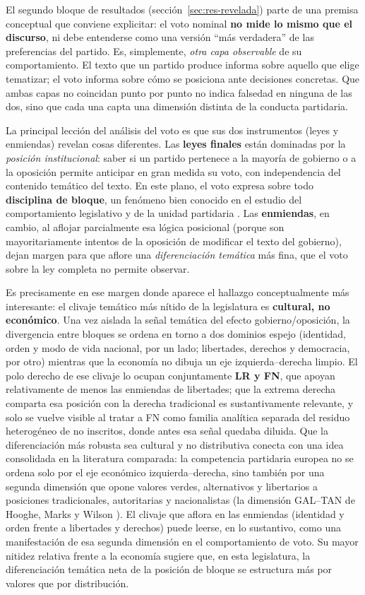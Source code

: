 El segundo bloque de resultados (sección~\ref{sec:res-revelada}) parte de una
premisa conceptual que conviene explicitar: el voto nominal \textbf{no mide lo
mismo que el discurso}, ni debe entenderse como una versión ``más verdadera'' de
las preferencias del partido. Es, simplemente, \emph{otra capa observable} de su
comportamiento. El texto que un partido produce informa sobre aquello que elige
tematizar; el voto informa sobre cómo se posiciona ante decisiones concretas. Que
ambas capas no coincidan punto por punto no indica falsedad en ninguna de las
dos, sino que cada una capta una dimensión distinta de la conducta partidaria.

La principal lección del análisis del voto es que sus dos instrumentos (leyes y
enmiendas) revelan cosas diferentes. Las \textbf{leyes finales} están dominadas
por la \emph{posición institucional}: saber si un partido pertenece a la mayoría
de gobierno o a la oposición permite anticipar en gran medida su voto, con
independencia del contenido temático del texto. En este plano, el voto expresa
sobre todo \textbf{disciplina de bloque}, un fenómeno bien conocido en el estudio
del comportamiento legislativo y de la unidad partidaria
\cite{sieberer2006partyunity, carey2007competing}. Las \textbf{enmiendas}, en
cambio, al aflojar parcialmente esa lógica posicional (porque son
mayoritariamente intentos de la oposición de modificar el texto del gobierno),
dejan margen para que aflore una \emph{diferenciación temática} más fina, que el
voto sobre la ley completa no permite observar.

Es precisamente en ese margen donde aparece el hallazgo conceptualmente más
interesante: el clivaje temático más nítido de la legislatura es \textbf{cultural,
no económico}. Una vez aislada la señal temática del efecto gobierno/oposición,
la divergencia entre bloques se ordena en torno a dos dominios espejo
(identidad, orden y modo de vida nacional, por un lado; libertades, derechos y
democracia, por otro) mientras que la economía no dibuja un eje
izquierda--derecha limpio. El polo derecho de ese clivaje lo ocupan
conjuntamente \textbf{LR y FN}, que apoyan relativamente de menos las enmiendas
de libertades; que la extrema derecha comparta esa posición con la derecha
tradicional es sustantivamente relevante, y solo se vuelve visible al tratar a FN
como familia analítica separada del residuo heterogéneo de no inscritos, donde
antes esa señal quedaba diluida. Que la diferenciación más robusta sea cultural y no
distributiva conecta con una idea consolidada en la literatura comparada: la
competencia partidaria europea no se ordena solo por el eje económico
izquierda--derecha, sino también por una segunda dimensión que opone valores
verdes, alternativos y libertarios a posiciones tradicionales, autoritarias y
nacionalistas (la dimensión GAL--TAN de Hooghe, Marks y Wilson
\cite{hooghe2002galtan}). El clivaje que aflora en las enmiendas (identidad y
orden frente a libertades y derechos) puede leerse, en lo sustantivo, como una
manifestación de esa segunda dimensión en el comportamiento de voto. Su mayor
nitidez relativa frente a la economía sugiere que, en esta legislatura, la
diferenciación temática neta de la posición de bloque se estructura más por
valores que por distribución.

